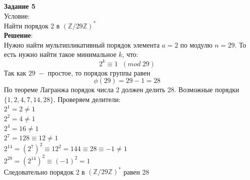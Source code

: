 \documentclass[12pt]{article}
\begin{document}
\begin{flushleft}
    \textbf{Задание 5} \\
    Условие: \\
    Найти порядок 2 в $(\mathbb{Z}/29\mathbb{Z})^*$ \\
    
    \vspace{20pt}
    \textbf{Решение}: \\
    Нужно найти мультипликативный порядок элемента $a = 2$ по модулю $n=29$. То есть нужно найти такое минимальное $k$, что: 
    \[ 2^k \equiv 1 \; \; (mod \; 29) \]
    Так как $29 \; -$ простое, то порядок группы равен
    \[ \phi(29) = 29 - 1 = 28 \]
    По теореме Лагранжа порядок числа 2 должен делить 28. Возможные порядки $\{1, 2, 4, 7, 14, 28\}$. Проверяем делители: \\
    $2^1 = 2 \neq 1 $ \\
    $2^2 = 4 \neq 1 $ \\
    $2^4 = 16 \neq 1 $ \\
    $2^7 = 128 \equiv 12 \neq 1 $ \\
    $2^{14} = (2^7)^2 \equiv 12^2 = 144 \equiv 28 \equiv -1 \neq 1 $ \\
    $2^{28} =(2^{14})^2 \equiv (-1)^2 = 1 $ \\
    Следовательно порядок 2 в $(\mathbb{Z}/29\mathbb{Z})^*$ равен 28\\

\end{flushleft}
\end{document}
